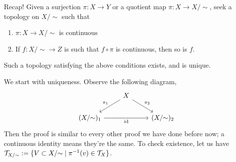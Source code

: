 \noindent Recap! Given a surjection $\pi : X \to Y$ or a quotient map $\pi : X \to X/{\sim}$, seek a topology on $X/{\sim}$ such that
\begin{enumerate}[label=(\alph*)]
    \item $\pi : X \to X/{\sim}$ is continuous
    \item If $f : X/{\sim} \to Z$ is such that $f \circ \pi$ is continuous, then so is $f$.
\end{enumerate}
\begin{simplethm}
    Such a topology satisfying the above conditions exists, and is unique.
\end{simplethm}
\noindent We start with uniqueness. Observe the following diagram,
\[\begin{tikzcd}
	& X \\
	{(X/{\sim})_1} && {(X/{\sim})_2}
	\arrow["{\pi_1}"', from=1-2, to=2-1]
	\arrow["{\pi_2}", from=1-2, to=2-3]
	\arrow["\id"', from=2-1, to=2-3]
\end{tikzcd}\]
Then the proof is similar to every other proof we have done before now; a continuous identity means they're the same. To check existence, let us have $\mathcal T_{X/{\sim}} := \{V \subset X/{\sim} \mid \pi^{-1}(v) \in \mathcal T_X\}$.


